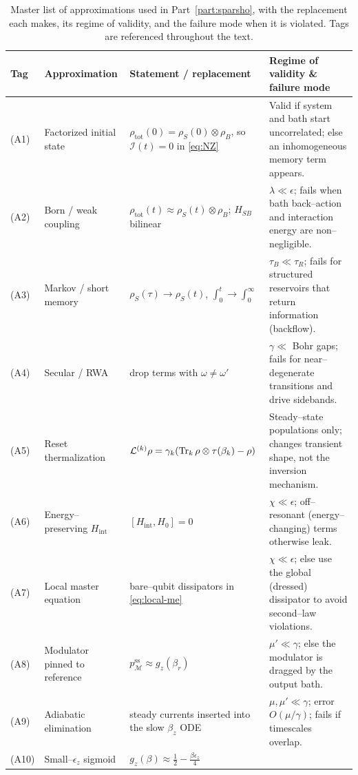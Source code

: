 \documentclass[11pt,a4paper]{article}
\theoremstyle{plain}
\theoremstyle{definition}
\theoremstyle{remark}
\newcommand{\calL}{\mathcal{L}}
\newcommand{\calM}{\mathcal{M}}
\newcommand{\gz}{g_z}
\newcommand{\calI}{\mathcal{I}}
\begin{document}
\begin{table}[t]
\centering\small
\caption{Master list of approximations used in Part~\ref{part:sparsho},
with the replacement each makes, its regime of validity, and the failure
mode when it is violated. Tags are referenced throughout the text.}
\label{tab:approximations}
\begin{tabularx}{\textwidth}{@{}l l X X@{}}
\toprule
Tag & Approximation & Statement / replacement & Regime of validity \& failure mode \\
\midrule
(A1) & Factorized initial state &
$\rho_{\mathrm{tot}}(0)=\rho_S(0)\otimes\rho_B$, so $\calI(t)=0$ in
\eqref{eq:NZ} &
Valid if system and bath start uncorrelated; else an inhomogeneous
memory term appears. \\
(A2) & Born / weak coupling &
$\rho_{\mathrm{tot}}(t)\approx\rho_S(t)\otimes\rho_B$; $H_{SB}$ bilinear &
$\lambda\ll\epsilon$; fails when bath back--action and interaction energy
are non--negligible. \\
(A3) & Markov / short memory &
$\rho_S(\tau)\to\rho_S(t)$, $\int_0^t\to\int_0^\infty$ &
$\tau_B\ll\tau_R$; fails for structured reservoirs that return
information (backflow). \\
(A4) & Secular / RWA &
drop terms with $\omega\neq\omega'$ &
$\gamma\ll$ Bohr gaps; fails for near--degenerate transitions and drive
sidebands. \\
(A5) & Reset thermalization &
$\calL^{(k)}\rho=\gamma_k(\Tr_k\rho\otimes\tau(\beta_k)-\rho)$ &
Steady--state populations only; changes transient shape, not the
inversion mechanism. \\
(A6) & Energy--preserving $H_{\mathrm{int}}$ &
$[H_{\mathrm{int}},H_0]=0$ &
$\chi\ll\epsilon$; off--resonant (energy--changing) terms otherwise leak. \\
(A7) & Local master equation &
bare--qubit dissipators in \eqref{eq:local-me} &
$\chi\ll\epsilon$; else use the global (dressed) dissipator to avoid
second--law violations. \\
(A8) & Modulator pinned to reference &
$p_\calM^{\mathrm{ss}}\approx\gz(\beta_r)$ &
$\mu'\ll\gamma$; else the modulator is dragged by the output bath. \\
(A9) & Adiabatic elimination &
steady currents inserted into the slow $\beta_z$ ODE &
$\mu,\mu'\ll\gamma$; error $O(\mu/\gamma)$; fails if timescales overlap. \\
(A10) & Small--$\epsilon_z$ sigmoid &
$\gz(\beta)\approx\tfrac12-\tfrac{\beta\epsilon_z}{4}$ &

\end{tabularx}
\end{table}
\end{document}
